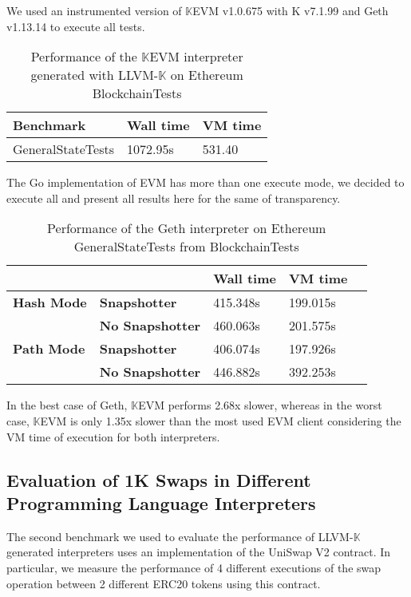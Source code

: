 \documentclass{article}
\theoremstyle{definition}
\newcommand{\K}{$\mathbb{K}$\xspace}
\newcommand{\KL}{LLVM-\K}
\begin{document}
We used an instrumented version of {\K}EVM v1.0.675 with K v7.1.99 and Geth v1.13.14 to execute all tests.

\begin{table}[!ht]
    \centering
    \begin{tabular}{l|l|l}
        \textbf{Benchmark} & \textbf{Wall time} & \textbf{VM time} \\ \hline
        GeneralStateTests & 1072.95s & 531.40 \\
    \end{tabular}
    \caption{Performance of the {\K}EVM interpreter generated with \KL on Ethereum BlockchainTests} 
    \label{tab:kevm-performance}
\end{table}

The Go implementation of EVM has more than one execute mode, we decided to execute all and present all results here for the same of transparency.

\begin{table}[!ht]
    \centering
    \begin{tabular}{l|l|l|l|l}
        \multicolumn{1}{c}{} & &\textbf{Wall time} & \textbf{VM time} \\ \hline
        \textbf{Hash Mode} & \textbf{Snapshotter} & 415.348s & 199.015s \\
        ~ & \textbf{No Snapshotter} & 460.063s & 201.575s \\  \hline
        \textbf{Path Mode} & \textbf{Snapshotter} & 406.074s & 197.926s \\ 
        ~ & \textbf{No Snapshotter} & 446.882s & 392.253s \\ 
    \end{tabular}
    \caption{Performance of the Geth interpreter on Ethereum GeneralStateTests from BlockchainTests}
    \label{tab:geth-performance}
\end{table}

In the best case of Geth, {\K}EVM performs 2.68x slower, whereas in the worst case, {\K}EVM is only 1.35x slower than the most used EVM client considering the VM time of execution for both interpreters.


\subsection{Evaluation of 1K Swaps in Different Programming Language Interpreters}

The second benchmark we used to evaluate the performance of \KL generated interpreters uses an implementation of the UniSwap V2 \cite{Adams2020UniswapVC} contract. In particular, we measure the performance of 4 different executions of the swap operation between 2 different ERC20 tokens using this contract.
\end{document}
